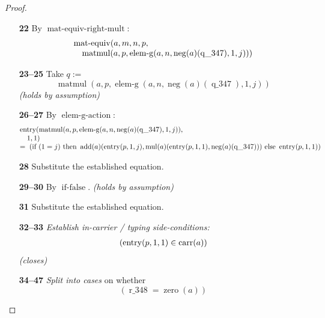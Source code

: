 \documentclass[11pt]{article}
\theoremstyle{plain}
\begin{document}
\begin{proof}
\begin{itemize}[leftmargin=2.8em, itemsep=4pt, parsep=1pt]
  \item[\textbf{22}] By $\operatorname{mat\text{-}equiv\text{-}right\text{-}mult}$:
\begin{equation*}
\begin{array}{@{}l@{}} \operatorname{mat\text{-}equiv}(a, m, n, p, \\ \quad \operatorname{matmul}(a, p, \operatorname{elem\text{-}g}(a, n, \operatorname{neg}(a)(\operatorname{q\_347}), 1, j))) \end{array}
\end{equation*}

  \item[\textbf{23--25}] Take $q :=$
\begin{equation*}
\operatorname{matmul}(a, p, \operatorname{elem\text{-}g}(a, n, \operatorname{neg}(a)(\operatorname{q\_347}), 1, j))
\end{equation*}
  \emph{(holds by assumption)}
  \item[\textbf{26--27}] By $\operatorname{elem\text{-}g\text{-}action}$:
\begin{equation*}
\begin{array}{@{}l@{}} \operatorname{entry}(\operatorname{matmul}(a, p, \operatorname{elem\text{-}g}(a, n, \operatorname{neg}(a)(\operatorname{q\_347}), 1, j)), \\ \quad 1, 1) \\ =\; \left(\text{if }(1 = j)\text{ then }\operatorname{add}(a)(\operatorname{entry}(p, 1, j), \operatorname{mul}(a)(\operatorname{entry}(p, 1, 1), \operatorname{neg}(a)(\operatorname{q\_347})))\text{ else }\operatorname{entry}(p, 1, 1)\right) \end{array}
\end{equation*}

  \item[\textbf{28}] Substitute the established equation.
  \item[\textbf{29--30}] By $\operatorname{if\text{-}false}$.  \emph{(holds by assumption)}
  \item[\textbf{31}] Substitute the established equation.
  \item[\textbf{32--33}] \emph{Establish in-carrier / typing side-conditions:}
\begin{equation*}
\begin{array}{@{}l@{}}
(\operatorname{entry}(p, 1, 1) \in \operatorname{carr}(a))
\end{array}
\end{equation*}
  \emph{(closes)}
  \item[\textbf{34--47}] \emph{Split into cases} on whether
\begin{equation*}
(\operatorname{r\_348} = \operatorname{zero}(a))
\end{equation*}


\end{itemize}
\end{proof}
\end{document}
